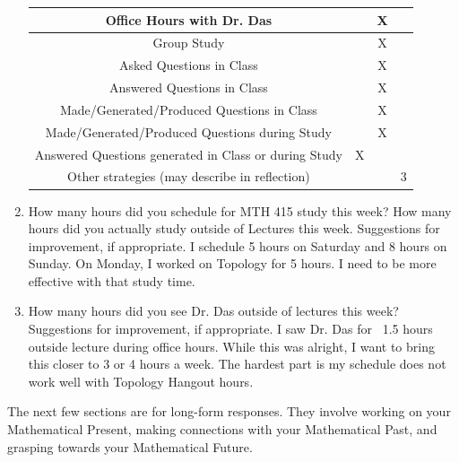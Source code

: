 \documentclass[10pt]{article}
\begin{document}
\begin{enumerate}
\begin{tabular}{|c|c|c|c|}

		Office Hours with Dr. Das &&X&\\
		\hline		
		Group Study&&X&\\
		\hline
		\hline
		Asked Questions in Class &&X&\\
		\hline
		Answered Questions in Class &&X&\\
		\hline
		\hline
		
		Made/Generated/Produced Questions in Class &&X&\\
		\hline
		Made/Generated/Produced Questions during Study &&X&\\
		\hline
		Answered Questions generated in Class or during Study &X&&\\
		\hline
		\hline
		
		Other strategies (may describe in reflection) &&&3\\
		\hline
		
			
	\end{tabular}

\item How many hours did you schedule for MTH 415 study this week? How many hours did you actually study outside of Lectures this week. Suggestions for improvement, if appropriate.
\vfill
I schedule 5 hours on Saturday and 8 hours on Sunday. On Monday, I worked on Topology for 5 hours. I need to be more effective with that study time.

\item How many hours did you see Dr. Das outside of lectures this week? Suggestions for improvement, if appropriate.
\vfill
I saw Dr. Das for ~1.5 hours outside lecture during office hours. While this was alright, I want to bring this closer to 3 or 4 hours a week. The hardest part is my schedule does not work well with Topology Hangout hours.

\end{enumerate}

\newpage
The next few sections are for long-form responses. They involve working on your Mathematical Present, making connections with your Mathematical Past, and grasping towards your Mathematical Future.
\end{document}
